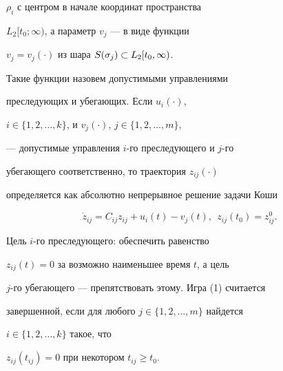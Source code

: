$\rho_i $ с центром в начале координат пространства 


$L_2[t_0; \infty) $, а параметр $v_j$ --- в виде функции 


$v_j = v_j(\cdot)$ из шара $S(\sigma_j) \subset L_2[t_0, \infty)$.


Такие функции назовем допустимыми управлениями


преследующих и убегающих. Если $ u_i(\cdot)$,


$i \in \{1,2, \dotsc , k \}$, и $v_j(\cdot)$, $j \in \{1,2, \dotsc, m \}$,


--- допустимые управления $i$-го преследующего и $j$-го


убегающего соответственно, то траектория $z_{ij}(\cdot) $ 


определяется как абсолютно непрерывное решение задачи Коши


$$


\Dot z_{ij} = C_{ij}z_{ij} + u_i(t) - v_j(t), \ \ z_{ij}(t_0) =


z_{ij}^0.


$$





Цель $i$-го преследующего: обеспечить равенство 


$z_{ij}(t) = 0 $ за возможно наименьшее время $t$, а цель


$j$-го убегающего --- препятствовать этому. Игра (1) считается


завершенной, если для любого $j\in \{1,2, \dotsc, m \} $ найдется


$i \in \{1,2, \dotsc, k \} $ такое, что


$ z_{ij}(t_{ij}) = 0 $ при некотором $t_{ij} \geq t_0$.





